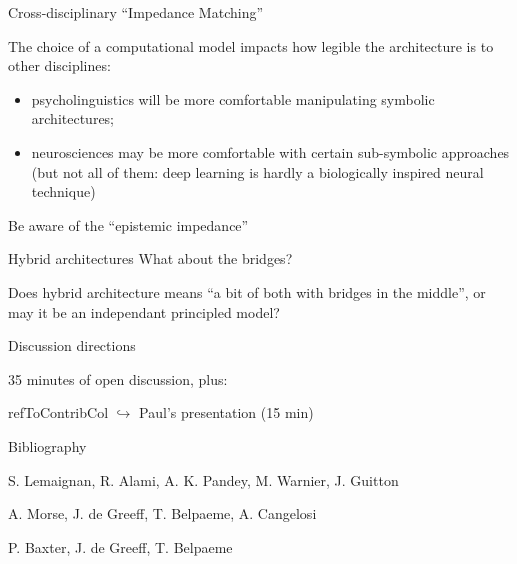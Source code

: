 \documentclass[compress]{beamer}
\newcommand{\refToContrib}[1]{%
    \begin{beamercolorbox}[wd=\linewidth,ht=2ex,dp=0.7ex]{refToContribCol}%
    \hspace{0.5em}$\hookrightarrow$ #1%
    \end{beamercolorbox}%
}%
\begin{document}
\begin{frame}{Cross-disciplinary ``Impedance Matching''}

    The choice of a computational model impacts how legible the architecture is
    to other disciplines:

    \begin{itemize}
        \item {\Medium psycholinguistics} will be more comfortable manipulating
            symbolic architectures;
        \item {\Medium neurosciences} may be more comfortable with certain
            sub-symbolic approaches (but not all of them: deep learning 
            is hardly a biologically inspired neural technique)
    \end{itemize}
    
    {\Medium Be aware of the ``epistemic impedance''}
\end{frame}

\begin{frame}{Hybrid architectures}
    {\Medium What about the bridges?}\par
    
    Does {\Medium hybrid architecture} means ``a bit of
    both with bridges in the middle'', or may it be an independant principled
    model?
\end{frame}

\begin{frame}{Discussion directions}

    35 minutes of open discussion, plus:
    \refToContrib{Paul's presentation (15 min)}

\end{frame}

\begin{frame}{Bibliography}
\begin{thebibliography}{10}

    \beamertemplatearticlebibitems
    S. Lemaignan, R. Alami, A. K. Pandey, M. Warnier, J. Guitton
    \newblock {}

    \beamertemplatearticlebibitems
    A. Morse, J. de Greeff, T. Belpaeme, A. Cangelosi
    \newblock {}

    \beamertemplatearticlebibitems
    P. Baxter, J. de Greeff, T. Belpaeme
    \newblock {}

  \end{thebibliography}
\end{frame}
\end{document}
